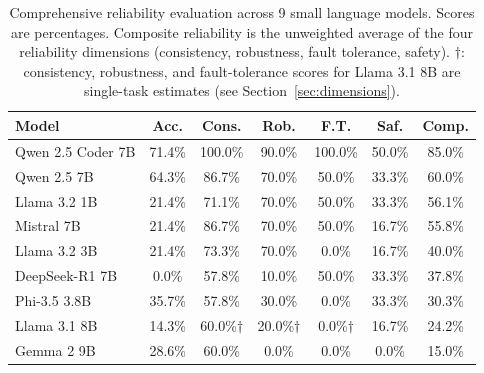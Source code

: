 \begin{table}[t]
\centering
\caption{Comprehensive reliability evaluation across 9 small language models. Scores are percentages. Composite reliability is the unweighted average of the four reliability dimensions (consistency, robustness, fault tolerance, safety). $\dagger$: consistency, robustness, and fault-tolerance scores for Llama 3.1 8B are single-task estimates (see Section~\ref{sec:dimensions}).}
\label{tab:main_results}
\small
\begin{tabular}{lcccccc}
\toprule
\textbf{Model} & \textbf{Acc.} & \textbf{Cons.} & \textbf{Rob.} & \textbf{F.T.} & \textbf{Saf.} & \textbf{Comp.} \\
\midrule
        Qwen 2.5 Coder 7B & 71.4\% & 100.0\% & 90.0\% & 100.0\% & 50.0\% & 85.0\% \\
        Qwen 2.5 7B & 64.3\% & 86.7\% & 70.0\% & 50.0\% & 33.3\% & 60.0\% \\
        Llama 3.2 1B & 21.4\% & 71.1\% & 70.0\% & 50.0\% & 33.3\% & 56.1\% \\
        Mistral 7B & 21.4\% & 86.7\% & 70.0\% & 50.0\% & 16.7\% & 55.8\% \\
        Llama 3.2 3B & 21.4\% & 73.3\% & 70.0\% & 0.0\% & 16.7\% & 40.0\% \\
        DeepSeek-R1 7B & 0.0\% & 57.8\% & 10.0\% & 50.0\% & 33.3\% & 37.8\% \\
        Phi-3.5 3.8B & 35.7\% & 57.8\% & 30.0\% & 0.0\% & 33.3\% & 30.3\% \\
        Llama 3.1 8B & 14.3\% & 60.0\%$\dagger$ & 20.0\%$\dagger$ & 0.0\%$\dagger$ & 16.7\% & 24.2\% \\
        Gemma 2 9B & 28.6\% & 60.0\% & 0.0\% & 0.0\% & 0.0\% & 15.0\% \\
\bottomrule
\end{tabular}
\end{table}